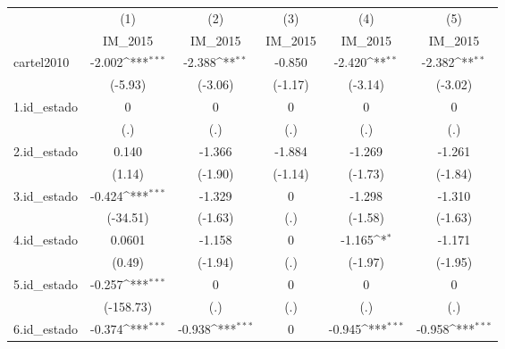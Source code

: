 {
\def\sym#1{\ifmmode^{#1}\else\(^{#1}\)\fi}
\begin{tabular}{l*{5}{c}}
\hline\hline
            &\multicolumn{1}{c}{(1)}&\multicolumn{1}{c}{(2)}&\multicolumn{1}{c}{(3)}&\multicolumn{1}{c}{(4)}&\multicolumn{1}{c}{(5)}\\
            &\multicolumn{1}{c}{IM\_2015}&\multicolumn{1}{c}{IM\_2015}&\multicolumn{1}{c}{IM\_2015}&\multicolumn{1}{c}{IM\_2015}&\multicolumn{1}{c}{IM\_2015}\\
\hline
cartel2010  &      -2.002\sym{***}&      -2.388\sym{**} &      -0.850         &      -2.420\sym{**} &      -2.382\sym{**} \\
            &     (-5.93)         &     (-3.06)         &     (-1.17)         &     (-3.14)         &     (-3.02)         \\
[1em]
1.id\_estado &           0         &           0         &           0         &           0         &           0         \\
            &         (.)         &         (.)         &         (.)         &         (.)         &         (.)         \\
[1em]
2.id\_estado &       0.140         &      -1.366         &      -1.884         &      -1.269         &      -1.261         \\
            &      (1.14)         &     (-1.90)         &     (-1.14)         &     (-1.73)         &     (-1.84)         \\
[1em]
3.id\_estado &      -0.424\sym{***}&      -1.329         &           0         &      -1.298         &      -1.310         \\
            &    (-34.51)         &     (-1.63)         &         (.)         &     (-1.58)         &     (-1.63)         \\
[1em]
4.id\_estado &      0.0601         &      -1.158         &           0         &      -1.165\sym{*}  &      -1.171         \\
            &      (0.49)         &     (-1.94)         &         (.)         &     (-1.97)         &     (-1.95)         \\
[1em]
5.id\_estado &      -0.257\sym{***}&           0         &           0         &           0         &           0         \\
            &   (-158.73)         &         (.)         &         (.)         &         (.)         &         (.)         \\
[1em]
6.id\_estado &      -0.374\sym{***}&      -0.938\sym{***}&           0         &      -0.945\sym{***}&      -0.958\sym{***}\\

\end{tabular}}
